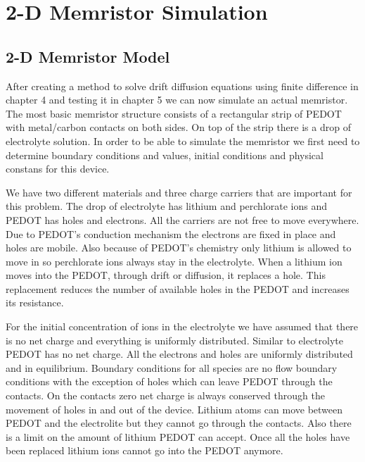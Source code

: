 
\chapter{2-D Memristor Simulation} %

\label{Chapter6} %


\section{2-D Memristor Model}


After creating a method to solve drift diffusion equations using finite difference in chapter 4 and testing it in chapter 5 we can now simulate an actual memristor. The most basic memristor structure consists of a rectangular strip of PEDOT with metal/carbon contacts on both sides. On top of the strip there is a drop of electrolyte solution. In order to be able to simulate the memristor we first need to determine boundary conditions and values, initial conditions and physical constans for this device.

We have two different materials and three charge carriers that are important for this problem. The drop of electrolyte has lithium and perchlorate ions and PEDOT has holes and electrons. All the carriers are not free to move everywhere. Due to PEDOT's conduction mechanism the electrons are fixed in place and holes are mobile. Also because of PEDOT's chemistry only lithium is allowed to move in so perchlorate ions always stay in the electrolyte. When a lithium ion moves into the PEDOT, through drift or diffusion, it replaces a hole. This replacement reduces the number of available holes in the PEDOT and increases its resistance. 

For the initial concentration of ions in the electrolyte we have assumed that there is no net charge and everything is uniformly distributed. Similar to electrolyte PEDOT has no net charge. All the electrons and holes are uniformly distributed and in equilibrium. Boundary conditions for all species are no flow boundary conditions with the exception of holes which can leave PEDOT through the contacts. On the contacts zero net charge is always conserved through the movement of holes in and out of the device. Lithium atoms can move between PEDOT and the electrolite but they cannot go through the contacts. Also there is a limit on the amount of lithium PEDOT can accept. Once all the holes have been replaced lithium ions cannot go into the PEDOT anymore.


